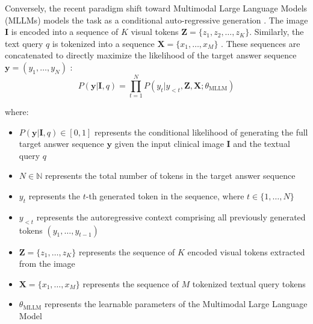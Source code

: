 Conversely, the recent paradigm shift toward Multimodal Large Language Models (MLLMs) models the task as a conditional auto-regressive generation \cite{yin2024mllm-survey}. The image $\mathbf{I}$ is encoded into a sequence of $K$ visual tokens $\mathbf{Z} = \{z_1, z_2, \dots, z_K\}$. Similarly, the text query $q$ is tokenized into a sequence $\mathbf{X} = \{x_1, \dots, x_M\}$ \cite{alayrac2022flamingo}. These sequences are concatenated to directly maximize the likelihood of the target answer sequence $\mathbf{y} = (y_1, \dots, y_N)$ \cite{liu2023llava}:
\begin{equation}
P(\mathbf{y} | \mathbf{I}, q) = \prod_{t=1}^{N} P(y_t | y_{<t}, \mathbf{Z}, \mathbf{X}; \theta_{\text{MLLM}})
\end{equation}

where:
\begin{itemize}
\item $P(\mathbf{y} | \mathbf{I}, q) \in [0,1]$ represents the conditional likelihood of generating the full target answer sequence $\mathbf{y}$ given the input clinical image $\mathbf{I}$ and the textual query $q$
\item $N \in \mathbb{N}$ represents the total number of tokens in the target answer sequence
\item $y_t$ represents the $t$-th generated token in the sequence, where $t \in \{1, \dots, N\}$
\item $y_{<t}$ represents the autoregressive context comprising all previously generated tokens $(y_1, \dots, y_{t-1})$
\item $\mathbf{Z} = \{z_1, \dots, z_K\}$ represents the sequence of $K$ encoded visual tokens extracted from the image
\item $\mathbf{X} = \{x_1, \dots, x_M\}$ represents the sequence of $M$ tokenized textual query tokens
\item $\theta_{\text{MLLM}}$ represents the learnable parameters of the Multimodal Large Language Model
\end{itemize}

